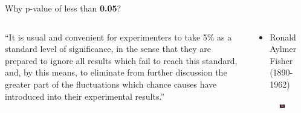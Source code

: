 \documentclass[
  ignorenonframetext,
]{beamer}
\providecommand{\tightlist}{%
  \setlength{\itemsep}{0pt}\setlength{\parskip}{0pt}}
\begin{document}
\begin{frame}{Why p-value of less than \textbf{0.05}?}
\label{why-p-value-of-less-than-0.05}
\begin{columns}[T]
\begin{column}{0.48\textwidth}
``It is usual and convenient for experimenters to take 5\% as a standard
level of significance, in the sense that they are prepared to ignore all
results which fail to reach this standard, and, by this means, to
eliminate from further discussion the greater part of the fluctuations
which chance causes have introduced into their experimental results.''
\end{column}

\begin{column}{0.48\textwidth}
\begin{itemize}
\tightlist
\item
  Ronald Aylmer Fisher (1890-1962)
\end{itemize}

\begin{figure}
\includegraphics[width=0.8\linewidth]{figs/fisher} \end{figure}
\end{column}
\end{columns}
\end{frame}
\end{document}
